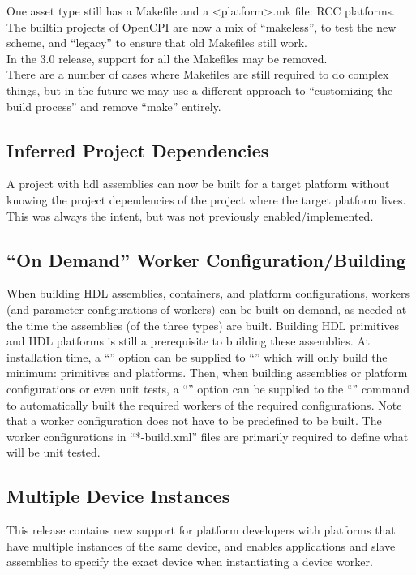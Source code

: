 One asset type still has a Makefile and a \textless platform\textgreater .mk file: RCC platforms.\\

The builtin projects of OpenCPI are now a mix of ``makeless'', to test the new scheme, and ``legacy'' to ensure that old Makefiles still work.\\

In the 3.0 release, support for all the Makefiles may be removed.\\

There are a number of cases where Makefiles are still required to do complex things, but in the future we may use a different approach to ``customizing the build process'' and remove ``make'' entirely.


\subsection{Inferred Project Dependencies}
\label{sec:22_project_deps}
A project with hdl assemblies can now be built for a target platform without knowing the project dependencies of the project where the target platform lives.  This was always the intent, but was not previously enabled/implemented.

\subsection{``On Demand'' Worker Configuration/Building}
\label{sec:22_on_demand}
When building HDL assemblies, containers, and platform configurations, workers (and parameter configurations of workers) can be built on demand, as needed at the time the assemblies (of the three types) are built.  Building HDL primitives and HDL platforms is still a prerequisite to building these assemblies.  At installation time, a ``'' option can be supplied to ``'' which will only build the minimum: primitives and platforms.  Then, when building assemblies or platform configurations or even unit tests, a ``'' option can be supplied to the ``'' command to automatically built the required workers of the required configurations.  Note that a worker configuration does not have to be predefined to be built.  The worker configurations in ``*-build.xml'' files are primarily required to define what will be unit tested.

\subsection{Multiple Device Instances}
\label{sec:22_device_inst}
This release contains new support for platform developers with platforms that have multiple instances of the same device, and enables applications and slave assemblies to specify the exact device when instantiating a device worker.

